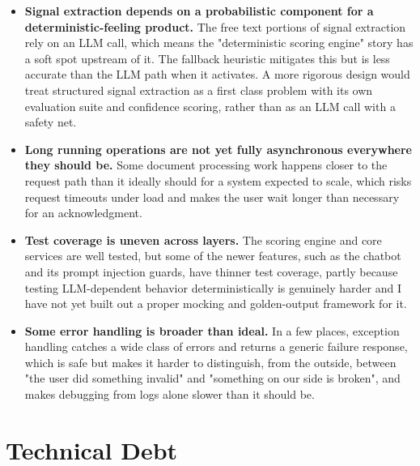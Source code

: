 \documentclass[11pt,a4paper]{report}
\begin{document}
\begin{itemize}[leftmargin=*]
\item \textbf{Signal extraction depends on a probabilistic component for a deterministic-feeling product.} The free text portions of signal extraction rely on an LLM call, which means the "deterministic scoring engine" story has a soft spot upstream of it. The fallback heuristic mitigates this but is less accurate than the LLM path when it activates. A more rigorous design would treat structured signal extraction as a first class problem with its own evaluation suite and confidence scoring, rather than as an LLM call with a safety net.

\item \textbf{Long running operations are not yet fully asynchronous everywhere they should be.} Some document processing work happens closer to the request path than it ideally should for a system expected to scale, which risks request timeouts under load and makes the user wait longer than necessary for an acknowledgment.

\item \textbf{Test coverage is uneven across layers.} The scoring engine and core services are well tested, but some of the newer features, such as the chatbot and its prompt injection guards, have thinner test coverage, partly because testing LLM-dependent behavior deterministically is genuinely harder and I have not yet built out a proper mocking and golden-output framework for it.

\item \textbf{Some error handling is broader than ideal.} In a few places, exception handling catches a wide class of errors and returns a generic failure response, which is safe but makes it harder to distinguish, from the outside, between "the user did something invalid" and "something on our side is broken", and makes debugging from logs alone slower than it should be.
\end{itemize}

\section{Technical Debt}
\end{document}

